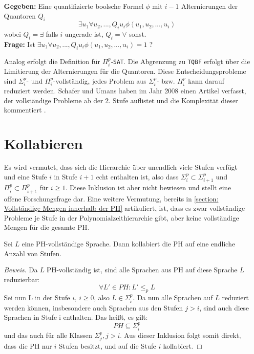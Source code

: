 \begin{definition} \cite{arora_computational_2009}
    \textbf{Gegeben:} Eine quantifizierte boolsche Formel $\phi$ mit $i-1$ Alternierungen der Quantoren $Q_i$ 
    $$
    \exists u_1 \forall u_2, ..., Q_i u_i \phi(u_1, u_2, ..., u_i)
    $$
    wobei $Q_i = \exists $ falls $i$ ungerade ist, $Q_i = \forall$ sonst. \\
    \textbf{Frage:} Ist $\exists u_1 \forall u_2, ..., Q_i u_i \phi(u_1, u_2, ..., u_i) = 1$ ?
\end{definition}

Analog erfolgt die Definition für $\Pi^p_i$-\texttt{SAT}. Die Abgrenzung zu \texttt{TQBF} erfolgt über die Limitierung der Alternierungen für die Quantoren.
Diese Entscheidungsprobleme sind $\Sigma^p_i$- und $\Pi^p_i$-vollständig, jedes Problem aus $\Sigma^p_i$- bzw. $\Pi^p_i$ kann darauf reduziert werden.
Schafer und Umans haben im Jahr 2008 einen Artikel verfasst, der vollständige Probleme ab der 2. Stufe auflistet und die Komplexität dieser kommentiert \cite{schaefer_completeness_nodate}.


\section{Kollabieren} \label{section: Kollabieren der PH}
Es wird vermutet, dass sich die Hierarchie über unendlich viele Stufen verfügt und eine Stufe $i$ in Stufe $i + 1$ echt enthalten ist,
also dass $\Sigma^p_i \subset \Sigma^p_{i+1}$ und $\Pi^p_i \subset \Pi^p_{i+1}$ für $i \geq 1$. Diese Inklusion ist aber nicht bewiesen und stellt eine offene
Forschungsfrage dar. Eine weitere Vermutung, bereits in \ref{section: Vollständige Mengen innerhalb der PH} artikuliert,  ist, dass es zwar vollständige Probleme je Stufe in der Polynomialzeithierarchie gibt, aber keine vollständige Mengen für die gesamte PH.
\begin{theorem}
    Sei $L$ eine PH-vollständige Sprache. Dann kollabiert die PH auf eine endliche Anzahl von Stufen. 
\end{theorem}

\begin{proof}[Beweis]
    Da $L$ PH-vollständig ist, sind alle Sprachen aus PH auf diese Sprache $L$ reduzierbar:
    $$
    \forall L' \in PH: L' \leq_p L
    $$
    Sei nun L in der Stufe $i$, $i \geq 0$, also $L \in \Sigma^p_i$. Da nun alle Sprachen auf $L$ reduziert werden können, insbesondere
    auch Sprachen aus den Stufen $j > i$, sind auch diese Sprachen in Stufe i enthalten.
    Das heißt, es gilt: 
    $$
    PH \subseteq \Sigma^p_i
    $$ 
    und das auch für alle Klassen $\Sigma^p_j, j> i$.
    Aus dieser Inklusion folgt somit direkt, dass die PH nur $i$ Stufen besitzt, und auf die Stufe $i$ kollabiert.
\end{proof}

